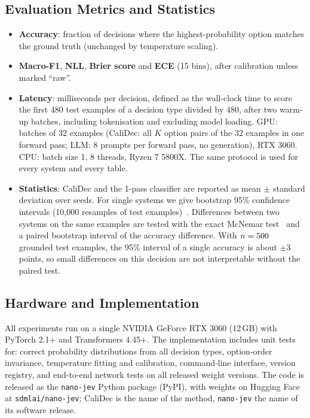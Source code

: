 \documentclass[twocolumn]{ICCKjournal}
\begin{document}
\subsection{Evaluation Metrics and Statistics}
\begin{itemize}[leftmargin=*]
    \item \textbf{Accuracy}: fraction of decisions where the highest-probability option matches the ground truth (unchanged by temperature scaling).
    \item \textbf{Macro-F1}, \textbf{NLL}, \textbf{Brier score} and \textbf{ECE} (15 bins), after calibration unless marked ``raw''.
    \item \textbf{Latency}: milliseconds per decision, defined as the wall-clock time to score the first 480 test examples of a decision type divided by 480, after two warm-up batches, including tokenisation and excluding model loading. GPU: batches of 32 examples (CaliDec: all $K$ option pairs of the 32 examples in one forward pass; LLM: 8 prompts per forward pass, no generation), RTX 3060. CPU: batch size 1, 8 threads, Ryzen 7 5800X. The same protocol is used for every system and every table.
    \item \textbf{Statistics}: CaliDec and the 1-pass classifier are reported as mean $\pm$ standard deviation over seeds. For single systems we give bootstrap 95\% confidence intervals (10,000 resamples of test examples)~\cite{efron1993bootstrap}. Differences between two systems on the same examples are tested with the exact McNemar test~\cite{mcnemar1947note, dietterich1998approximate} and a paired bootstrap interval of the accuracy difference. With $n=500$ grounded test examples, the 95\% interval of a single accuracy is about $\pm$3 points, so small differences on this decision are not interpretable without the paired test.
\end{itemize}

\subsection{Hardware and Implementation}
All experiments run on a single NVIDIA GeForce RTX 3060 (12\,GB) with PyTorch 2.1+ and Transformers 4.45+. The implementation includes unit tests for: correct probability distributions from all decision types, option-order invariance, temperature fitting and calibration, command-line interface, version registry, and end-to-end network tests on all released weight versions. The code is released as the \texttt{nano-jev} Python package (PyPI), with weights on Hugging Face at \texttt{sdmlai/nano-jev}; CaliDec is the name of the method, \texttt{nano-jev} the name of its software release.
\end{document}
